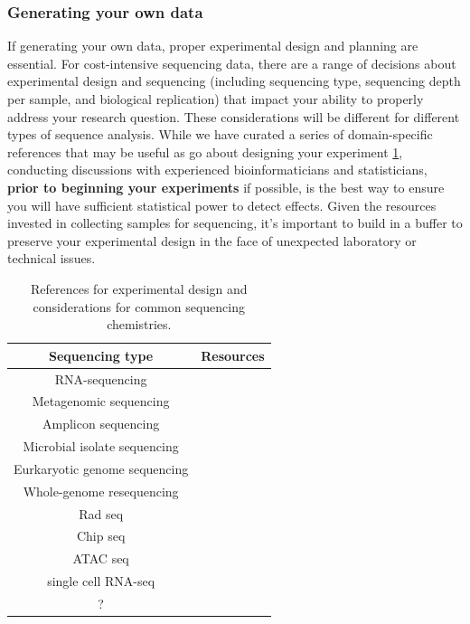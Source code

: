 \documentclass[10pt,letterpaper]{article}
\begin{document}

\subsubsection*{Generating your own data}
If generating your own data, proper experimental design and planning are essential. 
For cost-intensive sequencing data, there are a range of decisions about experimental design and sequencing (including sequencing type, sequencing depth per sample, and biological replication) that impact your ability to properly address your research question. 
These considerations will be different for different types of sequence analysis. 
While we have curated a series of domain-specific references that may be useful as go about designing your experiment \ref{tab:seq_resources}, conducting discussions with experienced bioinformaticians and statisticians, \textbf{prior to beginning your experiments} if possible, is the best way to ensure you will have sufficient statistical power to detect effects.
Given the resources invested in collecting samples for sequencing, it's important to build in a buffer to preserve your experimental design in the face of unexpected laboratory or technical issues. 

\begin{table}
\begin{tabular}{|c|c|}
\hline
\textbf{Sequencing type} & \textbf{Resources} \\
\hline
RNA-sequencing & \cite{conesa2016, schurch2016, ching2014} \\
\hline
Metagenomic sequencing & \cite{knight2012, quince2017, eisenhofer2019} \\
\hline
Amplicon sequencing & \cite{mclaren2019, murray2015, sinha2017 } \\
\hline
Microbial isolate sequencing & \cite{liao2015} \\
\hline
Eurkaryotic genome sequencing & \\
\hline
Whole-genome resequencing & \cite{fuentes2017} \\
\hline
Rad seq & \\
\hline
Chip seq & \\
\hline
ATAC seq & \\
\hline
single cell RNA-seq & \cite{bacher2016, haque2017} \\
\hline
? & \\
\hline
\end{tabular} 
\caption{\label{tab:seq_resources} References for experimental design and considerations for common sequencing chemistries.}
\end{table}
\end{document}
